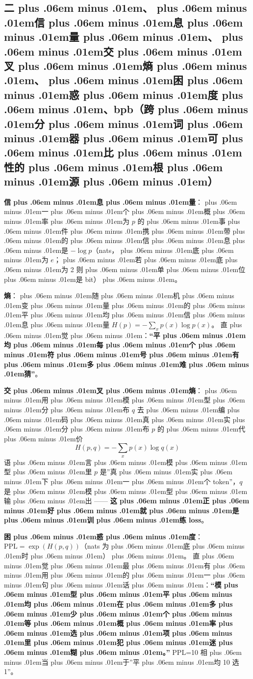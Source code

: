 \documentclass[
]{article}
\providecommand{\texorpdfstring}[2]{#1}   %
\def\zh#1{{\zhfont #1}}
\def\zhglue{\hskip0pt plus .06em minus .01em}
\begin{document}
\subsection{\texorpdfstring{\zh{二\zhglue 、\zhglue 信\zhglue 息\zhglue 量\zhglue 、\zhglue 交\zhglue 叉\zhglue 熵\zhglue 、\zhglue 困\zhglue 惑\zhglue 度\zhglue 、}bpb\zh{（}\textbf{\zh{跨\zhglue 分\zhglue 词\zhglue 器\zhglue 可\zhglue 比\zhglue 性}}\zh{的\zhglue 根\zhglue 源\zhglue ）}}{\zh{二\zhglue 、\zhglue 信\zhglue 息\zhglue 量\zhglue 、\zhglue 交\zhglue 叉\zhglue 熵\zhglue 、\zhglue 困\zhglue 惑\zhglue 度\zhglue 、}bpb\zh{（\zhglue 跨\zhglue 分\zhglue 词\zhglue 器\zhglue 可\zhglue 比\zhglue 性\zhglue 的\zhglue 根\zhglue 源\zhglue ）}}}\label{ux4e8cux4fe1ux606fux91cfux4ea4ux53c9ux71b5ux56f0ux60d1ux5ea6bpbux8de8ux5206ux8bcdux5668ux53efux6bd4ux6027ux7684ux6839ux6e90}

\textbf{\zh{信\zhglue 息\zhglue 量}}\zh{：\zhglue 一\zhglue 个\zhglue 概\zhglue 率\zhglue 为} \(p\) \zh{的\zhglue 事\zhglue 件\zhglue 携\zhglue 带\zhglue 的\zhglue 信\zhglue 息\zhglue 是} \(-\log p\)\zh{（}nats\zh{，\zhglue 底\zhglue 为} \(e\)\zh{；\zhglue 若\zhglue 底\zhglue 为} 2 \zh{则\zhglue 单\zhglue 位\zhglue 是} bit\zh{）\zhglue 。}

\textbf{\zh{熵}}\zh{：\zhglue 随\zhglue 机\zhglue 变\zhglue 量\zhglue 的\zhglue 平\zhglue 均\zhglue 信\zhglue 息\zhglue 量} \(H(p) = -\sum_x p(x)\log p(x)\)\zh{。} \zh{直\zhglue 觉\zhglue ：}\textbf{``\zh{平\zhglue 均\zhglue 每\zhglue 个\zhglue 符\zhglue 号\zhglue 有\zhglue 多\zhglue 难\zhglue 猜}''}\zh{。}

\textbf{\zh{交\zhglue 叉\zhglue 熵}}\zh{：\zhglue 用\zhglue 模\zhglue 型\zhglue 分\zhglue 布} \(q\) \zh{去\zhglue 编\zhglue 码\zhglue 真\zhglue 实\zhglue 分\zhglue 布} \(p\) \zh{的\zhglue 代\zhglue 价} \[H(p,q) = -\sum_x p(x)\log q(x)\] \zh{语\zhglue 言\zhglue 模\zhglue 型\zhglue 里} \(p\) \zh{是}''\zh{真\zhglue 实\zhglue 下\zhglue 一\zhglue 个} token''\zh{，}\(q\) \zh{是\zhglue 模\zhglue 型\zhglue 输\zhglue 出} ------ \textbf{\zh{这\zhglue 正\zhglue 好\zhglue 就\zhglue 是\zhglue 训\zhglue 练} loss}\zh{。}

\textbf{\zh{困\zhglue 惑\zhglue 度}}\zh{：}\(\mathrm{PPL} = \exp(H(p,q))\)\zh{（}nats \zh{为\zhglue 底\zhglue 时\zhglue ）\zhglue 。} \zh{直\zhglue 觉\zhglue 最\zhglue 有\zhglue 用\zhglue 的\zhglue 一\zhglue 句\zhglue 话\zhglue ：}\textbf{``\zh{模\zhglue 型\zhglue 平\zhglue 均\zhglue 在\zhglue 多\zhglue 少\zhglue 个\zhglue 等\zhglue 概\zhglue 率\zhglue 选\zhglue 项\zhglue 里\zhglue 犯\zhglue 迷\zhglue 糊\zhglue 。}''} PPL=10 \zh{相\zhglue 当\zhglue 于}''\zh{平\zhglue 均} 10 \zh{选} 1''\zh{。}
\end{document}
